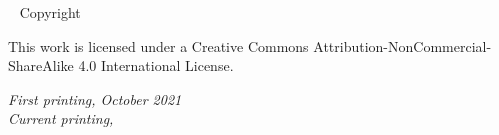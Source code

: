 \newpage
\begin{fullwidth}
~\vfill
\thispagestyle{empty}
\setlength{\parindent}{0pt}
\setlength{\parskip}{\baselineskip}
Copyright \textcopyright \the\year\ \thanklessauthor

\par{}

\par This work is licensed under a Creative Commons Attribution-NonCommercial-ShareAlike 4.0 International License.

\par{\textit{First printing, October 2021}\\[1pt]
\textit{Current printing, \Month \ \the\year}}

\end{fullwidth}